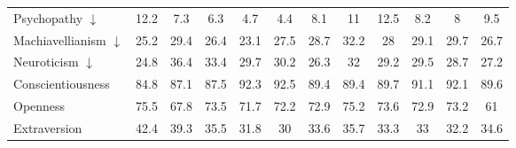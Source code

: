 \begin{table}[ht]
\begin{tabular}{l|ccccc|ccccc|c}
Psychopathy $\downarrow$ & \cellcolor{myred!48} 12.2 & \cellcolor{royalblue!39} 7.3 & \cellcolor{royalblue!56} 6.3 & \cellcolor{royalblue!85} 4.7 & \cellcolor{royalblue!90} 4.4 & \cellcolor{royalblue!25} 8.1 & \cellcolor{myred!26} 11 & \cellcolor{myred!53} 12.5 & \cellcolor{royalblue!23} 8.2 & \cellcolor{royalblue!26} 8 & 9.5 \\
Machiavellianism $\downarrow$ & \cellcolor{royalblue!25} 25.2 & \cellcolor{myred!44} 29.4 & \cellcolor{royalblue!5} 26.4 & \cellcolor{royalblue!59} 23.1 & \cellcolor{myred!13} 27.5 & \cellcolor{myred!33} 28.7 & \cellcolor{myred!90} 32.2 & \cellcolor{myred!21} 28 & \cellcolor{myred!39} 29.1 & \cellcolor{myred!49} 29.7 & 26.7 \\
Neuroticism $\downarrow$ & \cellcolor{royalblue!23} 24.8 & \cellcolor{myred!90} 36.4 & \cellcolor{myred!61} 33.4 & \cellcolor{myred!24} 29.7 & \cellcolor{myred!29} 30.2 & \cellcolor{royalblue!9} 26.3 & \cellcolor{myred!47} 32 & \cellcolor{myred!20} 29.2 & \cellcolor{myred!23} 29.5 & \cellcolor{myred!15} 28.7 & 27.2 \\
Conscientiousness & \cellcolor{myred!90} 84.8 & \cellcolor{myred!47} 87.1 & \cellcolor{myred!39} 87.5 & \cellcolor{royalblue!51} 92.3 & \cellcolor{royalblue!54} 92.5 & \cellcolor{myred!4} 89.4 & \cellcolor{myred!4} 89.4 & \cellcolor{royalblue!2} 89.7 & \cellcolor{royalblue!28} 91.1 & \cellcolor{royalblue!47} 92.1 & 89.6 \\
Openness & \cellcolor{royalblue!90} 75.5 & \cellcolor{royalblue!42} 67.8 & \cellcolor{royalblue!78} 73.5 & \cellcolor{royalblue!66} 71.7 & \cellcolor{royalblue!70} 72.2 & \cellcolor{royalblue!74} 72.9 & \cellcolor{royalblue!88} 75.2 & \cellcolor{royalblue!78} 73.6 & \cellcolor{royalblue!74} 72.9 & \cellcolor{royalblue!76} 73.2 & 61 \\
Extraversion & \cellcolor{royalblue!90} 42.4 & \cellcolor{royalblue!54} 39.3 & \cellcolor{royalblue!10} 35.5 & \cellcolor{myred!32} 31.8 & \cellcolor{myred!53} 30 & \cellcolor{myred!12} 33.6 & \cellcolor{royalblue!13} 35.7 & \cellcolor{myred!15} 33.3 & \cellcolor{myred!18} 33 & \cellcolor{myred!28} 32.2 & 34.6 \\
\bottomrule
\end{tabular}
\end{table}